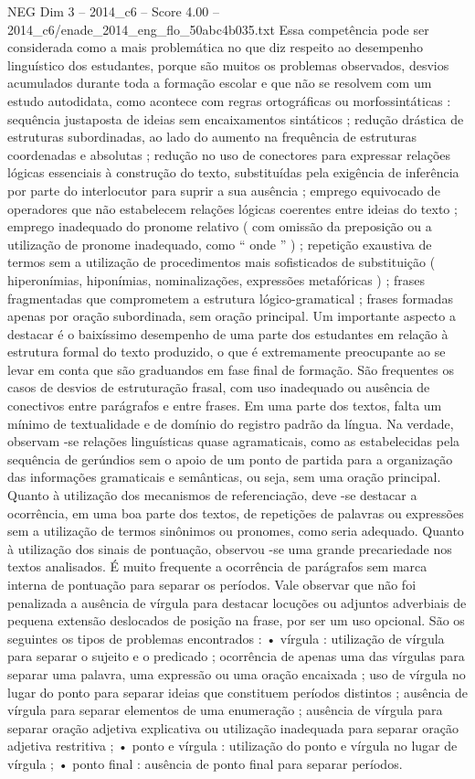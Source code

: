 \begin{textsample}{NEG Dim 3 – 2014\_c6 – Score 4.00 – 2014\_c6/enade\_2014\_eng\_flo\_50abc4b035.txt}
Essa competência pode ser considerada como a mais problemática no que diz respeito ao desempenho linguístico dos estudantes, porque são muitos os problemas observados, desvios acumulados durante toda a formação escolar e que não se resolvem com um estudo autodidata, como acontece com regras ortográficas ou morfossintáticas : sequência justaposta de ideias sem encaixamentos sintáticos ; redução drástica de estruturas subordinadas, ao lado do aumento na frequência de estruturas coordenadas e absolutas ; redução no uso de conectores para expressar relações lógicas essenciais à construção do texto, substituídas pela exigência de inferência por parte do interlocutor para suprir a sua ausência ; emprego equivocado de operadores que não estabelecem relações lógicas coerentes entre ideias do texto ; emprego inadequado do pronome relativo ( com omissão da preposição ou a utilização de pronome inadequado, como “ onde ” ) ; repetição exaustiva de termos sem a utilização de procedimentos mais sofisticados de substituição ( hiperonímias, hiponímias, nominalizações, expressões metafóricas ) ; frases fragmentadas que comprometem a estrutura lógico-gramatical ; frases formadas apenas por oração subordinada, sem oração principal.
Um importante aspecto a destacar é o baixíssimo desempenho de uma parte dos estudantes em relação à estrutura formal do texto produzido, o que é extremamente preocupante ao se levar em conta que são graduandos em fase final de formação.
São frequentes os casos de desvios de estruturação frasal, com uso inadequado ou ausência de conectivos entre parágrafos e entre frases.
Em uma parte dos textos, falta um mínimo de textualidade e de domínio do registro padrão da língua.
Na verdade, observam -se relações linguísticas quase agramaticais, como as estabelecidas pela sequência de gerúndios sem o apoio de um ponto de partida para a organização das informações gramaticais e semânticas, ou seja, sem uma oração principal.
Quanto à utilização dos mecanismos de referenciação, deve -se destacar a ocorrência, em uma boa parte dos textos, de repetições de palavras ou expressões sem a utilização de termos sinônimos ou pronomes, como seria adequado.
Quanto à utilização dos sinais de pontuação, observou -se uma grande precariedade nos textos analisados.
É muito frequente a ocorrência de parágrafos sem marca interna de pontuação para separar os períodos.
Vale observar que não foi penalizada a ausência de vírgula para destacar locuções ou adjuntos adverbiais de pequena extensão deslocados de posição na frase, por ser um uso opcional.
São os seguintes os tipos de problemas encontrados : • vírgula : utilização de vírgula para separar o sujeito e o predicado ; ocorrência de apenas uma das vírgulas para separar uma palavra, uma expressão ou uma oração encaixada ; uso de vírgula no lugar do ponto para separar ideias que constituem períodos distintos ; ausência de vírgula para separar elementos de uma enumeração ; ausência de vírgula para separar oração adjetiva explicativa ou utilização inadequada para separar oração adjetiva restritiva ; • ponto e vírgula : utilização do ponto e vírgula no lugar de vírgula ; • ponto final : ausência de ponto final para separar períodos.

\end{textsample}
